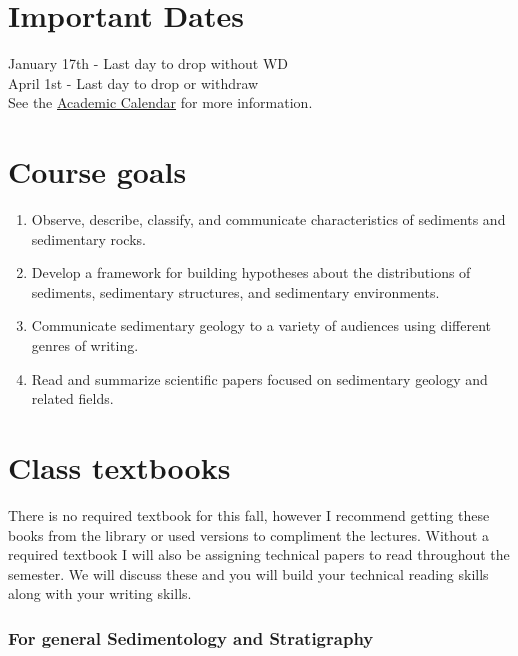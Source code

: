 \documentclass[11pt,]{article}
\begin{document}
\hypertarget{important-dates}{%
\section{Important Dates}\label{important-dates}}

January 17th - Last day to drop without WD\\
April 1st - Last day to drop or withdraw\\
See the \href{https://www.southalabama.edu/academiccalendar/}{Academic
Calendar} for more information.

\newpage

\hypertarget{course-goals-1}{%
\section{Course goals}\label{course-goals-1}}

\begin{enumerate}
\def\labelenumi{\arabic{enumi}.}
\item
  Observe, describe, classify, and communicate characteristics of
  sediments and sedimentary rocks.
\item
  Develop a framework for building hypotheses about the distributions of
  sediments, sedimentary structures, and sedimentary environments.
\item
  Communicate sedimentary geology to a variety of audiences using
  different genres of writing.
\item
  Read and summarize scientific papers focused on sedimentary geology
  and related fields.
\end{enumerate}

\hypertarget{class-textbooks}{%
\section{Class textbooks}\label{class-textbooks}}

There is no required textbook for this fall, however I recommend getting
these books from the library or used versions to compliment the
lectures. Without a required textbook I will also be assigning technical
papers to read throughout the semester. We will discuss these and you
will build your technical reading skills along with your writing skills.

\hypertarget{for-general-sedimentology-and-stratigraphy}{%
\subsubsection{For general Sedimentology and
Stratigraphy}\label{for-general-sedimentology-and-stratigraphy}}
\end{document}
